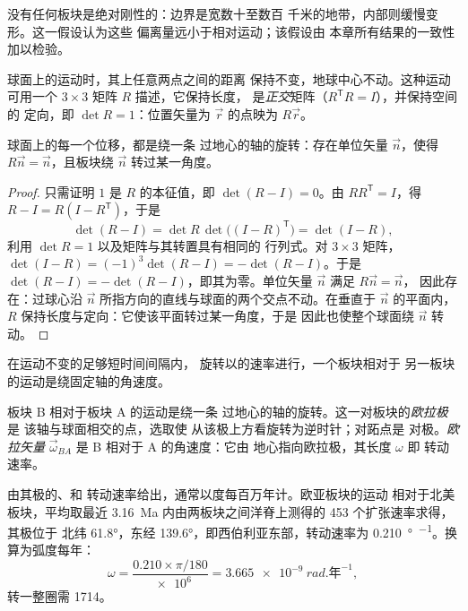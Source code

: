没有任何板块是绝对刚性的：边界是宽数十至数百
千米的地带，内部则缓慢变形。这一假设认为这些
偏离量远小于相对运动；该假设由
本章所有结果的一致性加以检验。

球面上的运动时，其上任意两点之间的距离
保持不变，地球中心不动。这种运动
可用一个 $3\times3$ 矩阵 $R$ 描述，它保持长度，
是\emph{正交}矩阵（$R^{\mathsf T}R = I$），并保持空间的
定向，即 $\det R = 1$：位置矢量为 $\vec r$ 的点映为
$R\vec r$。

\begin{theorem}[欧拉旋转定理]\label{thm:b1:plate-kinematics:euler}
球面上的每一个位移，都是绕一条
过地心的轴的旋转：存在单位矢量 $\vec n$，使得
$R\vec n = \vec n$，且板块绕 $\vec n$ 转过某一角度。
\end{theorem}

\begin{proof}
只需证明 $1$ 是 $R$ 的本征值，即 $\det(R - I) = 0$。由
$R R^{\mathsf T} = I$，得 $R - I = R(I - R^{\mathsf T})$，于是
\[
  \det(R - I) = \det R\,\det\bigl((I - R)^{\mathsf T}\bigr) = \det(I - R),
\]
利用 $\det R = 1$ 以及矩阵与其转置具有相同的
行列式。对 $3\times3$ 矩阵，
$\det(I - R) = (-1)^3\det(R - I) = -\det(R - I)$。于是 $\det(R - I) =
-\det(R - I)$，即其为零。单位矢量 $\vec n$ 满足 $R\vec n = \vec n$，
因此存在：过球心沿
$\vec n$ 所指方向的直线与球面的两个交点不动。在垂直于 $\vec n$ 的平面内，
$R$ 保持长度与定向：它使该平面转过某一角度，于是
因此也使整个球面绕 $\vec n$ 转动。
\end{proof}

在运动不变的足够短时间间隔内，
旋转以的速率进行，一个板块相对于
另一板块的运动是绕固定轴的角速度。

\begin{definition}\label{def:b1:plate-kinematics:euler-pole}
板块 B 相对于板块 A 的运动是绕一条
过地心的轴的旋转。这一对板块的\emph{欧拉极}是
该轴与球面相交的点，选取使
从该极上方看旋转为逆时针；对跖点是
对极。\emph{欧拉矢量}
$\vec\omega_{BA}$ 是 B 相对于 A 的角速度：它由
地心指向欧拉极，其长度 $\omega$ 即
转动速率。
\end{definition}

由其极的、和
转动速率给出，通常以度每百万年计。欧亚板块的运动
相对于北美板块，平均取最近 \qty{3.16}{Ma}
内由两板块之间洋脊上测得的 453 个扩张速率求得，其极位于
北纬 \ang{61.8}，东经 \ang{139.6}，即西伯利亚东部，转动速率为
\qty{0.210}{\degree\per\Ma}。换算为弧度每年：
\[
  \omega = \frac{0.210\times\pi/180}{\num{e6}} = \qty{3.665e-9}{rad.\text{年}^{-1}},
\]
转一整圈需 \qty{1714}{\Ma}。

